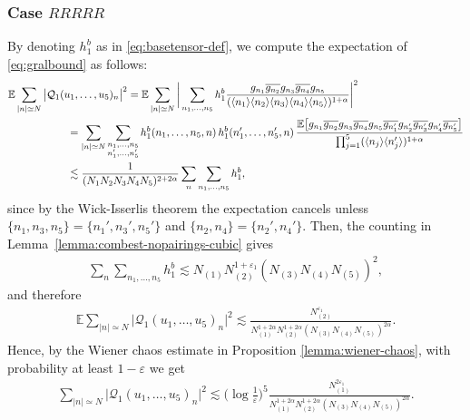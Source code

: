 \documentclass[11pt, xcolor = dvipsnames,reqno
]{amsart}
\theoremstyle{definition}
\theoremstyle{remark}
\begin{document}
\subsubsection{Case $RRRRR$}
\label{sec:RRRRR}
By denoting $h_1^b$ as in \eqref{eq:basetensor-def}, 
we compute the expectation of \eqref{eq:gralbound} as follows:
    \begin{equation}\label{eq:forexample-ghs}
     \begin{split}
         \mathbb E  \sum_{|n| \simeq N}  \big| \mathcal{Q}_1(u_1, \ldots, u_5)_n \big|^2
         & = \mathbb E \sum_{|n| \simeq N} \bigg| \sum_{ n_1, \ldots, n_5 } h^b_1\frac{g_{n_1} \overline{g_{n_2}}  g_{n_3} \overline{g_{n_4}} g_{n_5} } {( \langle n_1 \rangle \langle n_2 \rangle \langle n_3 \rangle \langle n_4 \rangle \langle n_5 \rangle )^{1 + \alpha}} \bigg|^2   \\
         & \hspace{-2cm} = \sum_{|n| \simeq N} \sum_{ \substack{ n_1, \ldots, n_5 \\ n_1', \ldots , n_5'}}  h^b_1(n_1, \ldots, n_5, n) \, h^b_1(n_1', \ldots, n_5',n) \,  \frac{\mathbb E \big[ g_{n_1} \overline{g_{n_2}}  g_{n_3} \overline{g_{n_4}} g_{n_5} \overline{g_{n_1'}} g_{n_2'} \overline{g_{n_3'}} g_{n_4'} \overline{g_{n_5'}} \big] } { \prod_{j=1}^5 ( \langle n_j \rangle \langle n_j' \rangle )^{1 + \alpha}}  \\
         & \hspace{-2cm}  \lesssim  \frac{1}{(N_1N_2N_3N_4N_5)^{2+2\alpha}} \sum_n \sum_{ n_1, \ldots, n_5} h^b_1, 
     \end{split}
\end{equation}
since by the Wick-Isserlis theorem the expectation cancels unless $\{n_1, n_3, n_5 \} = \{n_1', n_3', n_5'\}$ and $\{n_2, n_4\} = \{n_2', n_4'\}$.
Then, the counting in Lemma~\ref{lemma:combest-nopairings-cubic} gives 
\begin{align}
    \sum_n \sum_{ n_1, \ldots, n_5} h^b_1
    \lesssim N_{(1)} N_{(2)}^{1+\varepsilon_1}(N_{(3)}N_{(4)}N_{(5)})^2, 
\end{align}
and therefore 
\begin{align}
    \mathbb E  \sum_{|n| \simeq N}  \big| \mathcal{Q}_1(u_1, \ldots, u_5)_n \big|^2
    \lesssim \frac{N_{(2)}^{\varepsilon_1}}{ N_{(1)}^{1 + 2\alpha} N_{(2)}^{1 + 2\alpha} (N_{(3)}N_{(4)}N_{(5)})^{2\alpha}}. 
\end{align}
Hence, by the Wiener chaos estimate in Proposition \ref{lemma:wiener-chaos}, with probability at least $1-\varepsilon$ we get 
\begin{align}\label{eq:wiener-app1}
    \sum_{|n| \simeq N}  \big| \mathcal{Q}_1(u_1, \ldots, u_5)_n \big|^2
    \lesssim \Big(\log \frac{1}{\varepsilon} \Big)^5  \frac{N_{(1)}^{2\varepsilon_1}}{N_{(1)}^{1 + 2\alpha}  N_{(2)}^{1 + 2\alpha} (N_{(3)}N_{(4)}N_{(5)})^{2\alpha} }.
\end{align}
\end{document}

